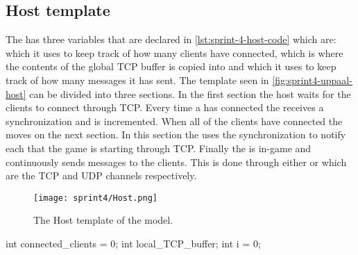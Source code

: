 \subsection{Host template}
The  has three variables that are declared in \autoref{lst:sprint-4-host-code} which are:
 which it uses to keep track of how many clients have connected,  which is where the contents of the global TCP buffer is copied into and  which it uses to keep track of how many messages it has sent. 
The template seen in \autoref{fig:sprint4-uppaal-host} can be divided into three sections.
In the first section the host waits for the clients to connect through TCP.
Every time a  has connected the  receives a  synchronization and  is incremented.
When all of the clients have connected the  moves on the next section.
In this section the  uses the  synchronization to notify each  that the game is starting through TCP.
Finally the  is in-game and continuously sends messages to the clients.
This is done through either  or  which are the TCP and UDP channels respectively.
\begin{figure}[h]
    \centering
    \texttt{[image: sprint4/Host.png]}
    \caption{The Host template of the \uppaal model.}
    \label{fig:sprint4-uppaal-host}
\end{figure}
\begin{uppaalcode}[caption={local Host declarations}, label={lst:sprint-4-host-code},captionpos=b]

int connected_clients = 0;
int local_TCP_buffer;
int i = 0;
\end{uppaalcode}


